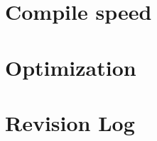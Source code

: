 \documentclass{report}
\begin{document}


\chapter{Compile speed}



\chapter{Optimization}



  
\chapter{Revision Log}



\end{document}
